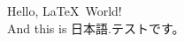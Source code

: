 \documentclass[lualatex]{jlreq}
\begin{document}
Hello, \LaTeX\ World!\\
And this is 日本語.テストです。
\end{document}
